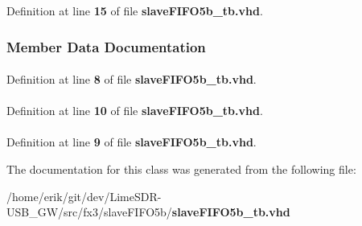 Definition at line {\bf 15} of file {\bf slave\+F\+I\+F\+O5b\+\_\+tb.\+vhd}.



\subsubsection{Member Data Documentation}
\paragraph[{ieee}]{\hspace{0.3cm}{\ttfamily [Library]}}\label{classslaveFIFO5b__tb_a0a6af6eef40212dbaf130d57ce711256}


Definition at line {\bf 8} of file {\bf slave\+F\+I\+F\+O5b\+\_\+tb.\+vhd}.

\paragraph[{numeric\+\_\+std}]{\hspace{0.3cm}{\ttfamily [Package]}}\label{classslaveFIFO5b__tb_a2edc34402b573437d5f25fa90ba4013e}


Definition at line {\bf 10} of file {\bf slave\+F\+I\+F\+O5b\+\_\+tb.\+vhd}.

\paragraph[{std\+\_\+logic\+\_\+1164}]{\hspace{0.3cm}{\ttfamily [Package]}}\label{classslaveFIFO5b__tb_acd03516902501cd1c7296a98e22c6fcb}


Definition at line {\bf 9} of file {\bf slave\+F\+I\+F\+O5b\+\_\+tb.\+vhd}.



The documentation for this class was generated from the following file\+:\begin{DoxyCompactItemize}
\item 
/home/erik/git/dev/\+Lime\+S\+D\+R-\/\+U\+S\+B\+\_\+\+G\+W/src/fx3/slave\+F\+I\+F\+O5b/{\bf slave\+F\+I\+F\+O5b\+\_\+tb.\+vhd}\end{DoxyCompactItemize}
